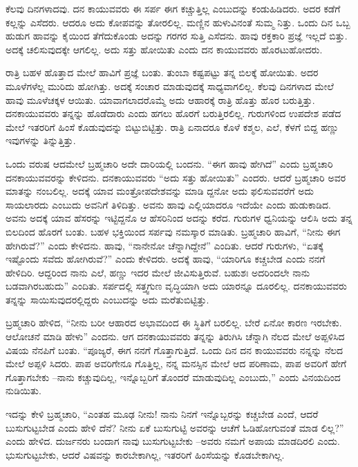 ಕೆಲವು ದಿನಗಳಾದವು. ದನ ಕಾಯುವವರು ಈ ಸರ್ಪ ಈಗ ಕಚ್ಚುತ್ತಿಲ್ಲ ಎಂಬುದನ್ನು ಕಂಡುಹಿಡಿದರು. ಅದರ ಕಡೆಗೆ ಕಲ್ಲನ್ನು ಎಸೆದರು. ಆದರೂ ಅದು ಕೋಪವನ್ನು ತೋರಲಿಲ್ಲ. ಮಣ್ಣಿನ ಹುಳುವಿನಂತೆ ಸುಮ್ಮ ನಿತ್ತು. ಒಂದು ದಿನ ಒಬ್ಬ ಹುಡುಗ ಹಾವನ್ನು ಕೈಯಿಂದ ತೆಗೆದುಕೊಂಡು ಅದನ್ನು ಗರಗರ ಸುತ್ತಿ ಎಸೆದನು. ಹಾವು ರಕ್ತಕಾರಿ ಪ್ರಜ್ಞೆ ಇಲ್ಲದೆ ಬಿತ್ತು. ಅದಕ್ಕೆ ಚಲಿಸುವುದಕ್ಕೇ ಆಗಲಿಲ್ಲ. ಅದು ಸತ್ತು ಹೋಯಿತು ಎಂದು ದನ ಕಾಯುವವರು ಹೊರಟುಹೋದರು.

ರಾತ್ರಿ ಬಹಳ ಹೊತ್ತಾದ ಮೇಲೆ ಹಾವಿಗೆ ಪ್ರಜ್ಞೆ ಬಂತು. ತುಂಬಾ ಕಷ್ಟಪಟ್ಟು ತನ್ನ ಬಿಲಕ್ಕೆ ಹೋಯಿತು. ಅದರ ಮೂಳೆಗಳೆಲ್ಲ ಮುರಿದು ಹೋಗಿತ್ತು. ಅದಕ್ಕೆ ಸಂಚಾರ ಮಾಡುವುದಕ್ಕೆ ಸಾಧ್ಯವಾಗಲಿಲ್ಲ. ಕೆಲವು ದಿನಗಳಾದ ಮೇಲೆ ಹಾವು ಮೂಳೆಚಕ್ಕಳ ಆಯಿತು. ಯಾವಾಗಲಾದರೊಮ್ಮೆ ಅದು ಆಹಾರಕ್ಕೆ ರಾತ್ರಿ ಹೊತ್ತು ಹೊರ ಬರುತ್ತಿತ್ತು. ದನಕಾಯುವವರು ತನ್ನನ್ನು ಹೊಡೆದಾರು ಎಂದು ಹಗಲು ಹೊರಗೆ ಬರುತ್ತಿರಲಿಲ್ಲ. ಗುರುಗಳಿಂದ ಉಪದೇಶ ಪಡೆದ ಮೇಲೆ ಇತರರಿಗೆ ಹಿಂಸೆ ಕೊಡುವುದನ್ನು ಬಿಟ್ಟುಬಿಟ್ಟಿತ್ತು. ರಾತ್ರಿ ಏನಾದರೂ ಕೊಳೆ ಕಶ್ಮಲ, ಎಲೆ, ಕೆಳಗೆ ಬಿದ್ದ ಹಣ್ಣು ಇವುಗಳನ್ನು ತಿನ್ನುತ್ತಿತ್ತು. 

ಒಂದು ವರುಷ ಆದಮೇಲೆ ಬ್ರಹ್ಮಚಾರಿ ಅದೇ ದಾರಿಯಲ್ಲಿ ಬಂದನು. “ಈಗ ಹಾವು ಹೇಗಿದೆ” ಎಂದು ಬ್ರಹ್ಮಚಾರಿ ದನಕಾಯುವವರನ್ನು ಕೇಳಿದನು. ದನಕಾಯುವವರು “ಅದು ಸತ್ತು ಹೋಯಿತು” ಎಂದರು. ಆದರೆ ಬ್ರಹ್ಮಚಾರಿ ಅವರ ಮಾತನ್ನು ನಂಬಲಿಲ್ಲ. ಅದಕ್ಕೆ ಯಾವ ಮಂತ್ರೋಪದೇಶವನ್ನು ಮಾಡಿ ದ್ದನೋ ಅದು ಫಲಿಸುವವರೆಗೆ ಅದು ಸಾಯಲಾರದು ಎಂಬುದು ಅವನಿಗೆ ತಿಳಿದಿತ್ತು. ಅವನು ಹಾವು ಎಲ್ಲಿಯಾದರೂ ಇದೆಯೇ ಎಂದು ಹುಡುಕಾಡಿದ. ಅವನು ಅದಕ್ಕೆ ಯಾವ ಹೆಸರನ್ನು ಇಟ್ಟಿದ್ದನೊ ಆ ಹೆಸರಿನಿಂದ ಅದನ್ನು ಕರೆದ. ಗುರುಗಳ ಧ್ವನಿಯನ್ನು ಆಲಿಸಿ ಅದು ತನ್ನ ಬಿಲದಿಂದ ಹೊರಗೆ ಬಂತು. ಬಹಳ ಭಕ್ತಿಯಿಂದ ಸರ್ಪವು ನಮಸ್ಕಾರ ಮಾಡಿತು. ಬ್ರಹ್ಮಚಾರಿ ಹಾವಿಗೆ, “ನೀನು ಈಗ ಹೇಗಿರುವೆ?” ಎಂದು ಕೇಳಿದನು. ಹಾವು, “ನಾನೇನೋ ಚೆನ್ನಾಗಿದ್ದೇನೆ” ಎಂದಿತು. ಆದರೆ ಗುರುಗಳು, “ಏತಕ್ಕೆ ಇಷ್ಟೊಂದು ಸವೆದು ಹೋಗಿರುವೆ?” ಎಂದು ಕೇಳಿದರು. ಅದಕ್ಕೆ ಹಾವು, “ಯಾರಿಗೂ ಕಚ್ಚಬೇಡ ಎಂದು ನನಗೆ ಹೇಳಿದಿರಿ. ಆದ್ದರಿಂದ ನಾನು ಎಲೆ, ಹಣ್ಣು ಇದರ ಮೇಲೆ ಜೀವಿಸುತ್ತಿರುವೆ. ಬಹುಶಃ ಅದರಿಂದಲೇ ನಾನು ಬಡವಾಗಿರಬಹುದು” ಎಂದಿತು. ಸರ್ಪದಲ್ಲಿ ಸತ್ತ್ವಗುಣ ವೃದ್ಧಿಯಾಗಿ ಅದು ಯಾರನ್ನೂ ದೂರಲಿಲ್ಲ. ದನಕಾಯುವವರು ತನ್ನನ್ನು ಸಾಯಿಸುವುದರಲ್ಲಿದ್ದರು ಎಂಬುದನ್ನು ಅದು ಮರೆತುಬಿಟ್ಟಿತ್ತು.

ಬ್ರಹ್ಮಚಾರಿ ಹೇಳಿದ, “ನೀನು ಬರೀ ಆಹಾರದ ಅಭಾವದಿಂದ ಈ ಸ್ಥಿತಿಗೆ ಬರಲಿಲ್ಲ. ಬೇರೆ ಏನೋ ಕಾರಣ ಇರಬೇಕು. ಆಲೋಚನೆ ಮಾಡಿ ಹೇಳು” ಎಂದನು. ಆಗ ದನಕಾಯುವವರು ತನ್ನನ್ನು ತಿರುಗಿಸಿ ಚೆನ್ನಾಗಿ ನೆಲದ ಮೇಲೆ ಅಪ್ಪಳಿಸಿದ ವಿಷಯ ನೆನಪಿಗೆ ಬಂತು. “ಪೂಜ್ಯರೆ, ಈಗ ನನಗೆ ಗೊತ್ತಾಗುತ್ತಿದೆ. ಒಂದು ದಿನ ದನ ಕಾಯುವವರು ನನ್ನನ್ನು ನೆಲದ ಮೇಲೆ ಅಪ್ಪಳಿ ಸಿದರು. ಪಾಪ ಅವರಿಗೇನೂ ಗೊತ್ತಿಲ್ಲ, ನನ್ನ ಮನಸ್ಸಿನ ಮೇಲೆ ಆದ ಪರಿಣಾಮ, ಪಾಪ ಅವರಿಗೆ ಹೇಗೆ ಗೊತ್ತಾಗಬೇಕು –ನಾನು ಕಚ್ಚುವುದಿಲ್ಲ, ಇನ್ನೊಬ್ಬರಿಗೆ ತೊಂದರೆ ಮಾಡುವುದಿಲ್ಲ ಎಂಬುದು,” ಎಂದು ವಿನಯದಿಂದ ನುಡಿಯಿತು.

ಇದನ್ನು ಕೇಳಿ ಬ್ರಹ್ಮಚಾರಿ, “ಎಂತಹ ಮೂಢ ನೀನು! ನಾನು ನಿನಗೆ ಇನ್ನೊಬ್ಬರನ್ನು ಕಚ್ಚಬೇಡ ಎಂದೆ, ಆದರೆ ಬುಸುಗುಟ್ಟಬೇಡ ಎಂದು ಹೇಳಿ ದೆನೆ? ನೀನು ಏಕೆ ಬುಸುಗುಟ್ಟಿ ಅವರನ್ನು ಆಚೆಗೆ ಓಡಿಹೋಗುವಂತೆ ಮಾಡ ಲಿಲ್ಲ?” ಎಂದು ಹೇಳಿದ. ದುರ್ಜನರು ಬಂದಾಗ ನಾವು ಬುಸುಗುಟ್ಟಬೇಕು –ಅವರು ನಮಗೆ ಅಪಾಯ ಮಾಡದಿರಲಿ ಎಂದು. ಭುಸುಗುಟ್ಟಬೇಕು, ಆದರೆ ವಿಷವನ್ನು ಕಾರಬೇಕಾಗಿಲ್ಲ, ಇತರರಿಗೆ ಹಿಂಸೆಯನ್ನು ಕೊಡಬೇಕಾಗಿಲ್ಲ.



